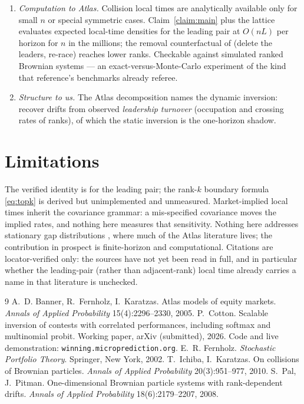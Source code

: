 \documentclass[11pt]{article}
\begin{document}
\begin{enumerate}
\item \emph{Computation to Atlas.} Collision local times are
analytically available only for small $n$ or special symmetric cases.
Claim~\ref{claim:main} plus the lattice evaluates expected
local-time densities for the leading pair at $O(nL)$ per horizon for
$n$ in the millions; the removal counterfactual of \citet{cotton2026}
(delete the leaders, re-race) reaches lower ranks. Checkable against
simulated ranked Brownian systems --- an exact-versus-Monte-Carlo
experiment of the kind that reference's benchmarks already referee.
\item \emph{Structure to us.} The Atlas decomposition names the dynamic
inversion: recover drifts from observed \emph{leadership turnover}
(occupation and crossing rates of ranks), of which the static inversion
is the one-horizon shadow.
\end{enumerate}

\section{Limitations}

The verified identity is for the leading pair; the rank-$k$ boundary
formula \eqref{eq:topk} is derived but unimplemented and unmeasured.
Market-implied local times inherit the covariance grammar: a
mis-specified covariance moves the implied rates, and nothing here
measures that sensitivity. Nothing here addresses stationary gap
distributions
\citep{palpitman2008}, where much of the Atlas literature lives; the
contribution in prospect is finite-horizon and computational. Citations
are locator-verified only: the sources have not yet been read in full,
and in particular whether the leading-pair (rather than adjacent-rank)
local time already carries a name in that literature is unchecked.

\begin{thebibliography}{9}\small
{}
A.~D. Banner, R.~Fernholz, I.~Karatzas. Atlas models of equity markets.
\emph{Annals of Applied Probability} 15(4):2296--2330, 2005.
 P.~Cotton. Scalable inversion of
contests with correlated performances, including softmax and
multinomial probit. Working paper, arXiv (submitted), 2026. Code and
live demonstration: \texttt{winning.microprediction.org}.
 E.~R. Fernholz.
\emph{Stochastic Portfolio Theory}. Springer, New York, 2002.
 T.~Ichiba,
I.~Karatzas. On collisions of Brownian particles. \emph{Annals of
Applied Probability} 20(3):951--977, 2010.
 S.~Pal, J.~Pitman.
One-dimensional Brownian particle systems with rank-dependent drifts.
\emph{Annals of Applied Probability} 18(6):2179--2207, 2008.
\end{thebibliography}
\end{document}
